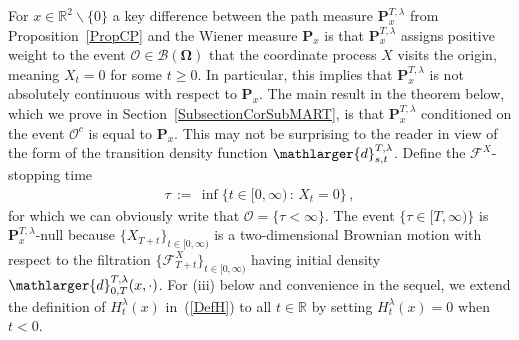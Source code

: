 \documentclass[10pt]{article}
\numberwithin{equation}{section}
\theoremstyle{definition}
\newcommand{\R}{{\mathbb R}}
\begin{document}
  For $x\in \R^2\backslash\{0\}$  a key difference between the path measure $\mathbf{P}^{T,\lambda}_{x}$ from Proposition~\ref{PropCP} and the Wiener measure $\mathbf{P}_{x} $ is that  $\mathbf{P}^{T,\lambda}_{x}$ assigns   positive weight to the event $\mathcal{O}\in \mathscr{B}(\boldsymbol{\Omega})$ that the coordinate process $X$ visits the origin, meaning $X_t=0$ for some $t\geq 0$. In particular, this implies that $\mathbf{P}^{T,\lambda}_{x}$ is not absolutely continuous with respect to  $\mathbf{P}_{x} $. The main result in the theorem below, which we prove in Section~\ref{SubsectionCorSubMART}, is that $\mathbf{P}_{x }^{T,\lambda}$  conditioned on the event $\mathcal{O}^c$ is equal to $\mathbf{P}_{x }$.  This may not be surprising to the reader in view of the form of the transition density function $\mathlarger{d}_{s,t}^{T,\lambda }$.  
  Define
   the  $\mathscr{F}^X$-stopping time 
  \begin{align*}
  \tau\,:=\,\inf\big\{ t\in [0,\infty) \,:\, X_t=0 \big\}\, ,  
\end{align*}
for which we can obviously write that   $\mathcal{O}=\{ \tau <\infty \} $.  The event  $ \{\tau\in [T,\infty) \}  $ is  $\mathbf{P}_{x }^{T,\lambda}$-null   because $\{X_{T+t}\}_{t\in [0,\infty)}$ is a two-dimensional Brownian motion with respect to the filtration $\{\mathscr{F}_{T+t}^{X} \}_{t\in [0,\infty)} $ having initial density $\mathlarger{d}_{0,T}^{T,\lambda }(x,\cdot)$.  For  (iii) below and  convenience in the sequel,  we  extend the definition of $H_{t}^{\lambda }(x)$ in~(\ref{DefH}) to all $t\in \R$ by setting $H_{t}^{\lambda }(x)=0$ when $t < 0$.
\end{document}
